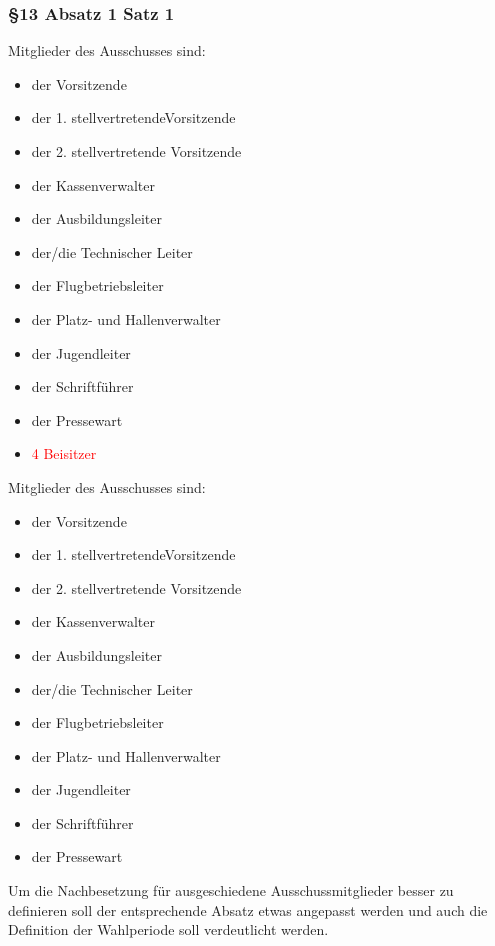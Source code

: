 \documentclass[10pt,a4paper,parskip=half]{scrartcl}
\newcommand{\old}[1]{\textcolor{Red}{#1}}
\newcommand{\change}[1]{
  \begin{adjustwidth}{20pt}{20pt}
    #1
  \end{adjustwidth}
}
\begin{document}
  \change{
  \subsubsection*{§13 Absatz 1 Satz 1}
  \begin{multicols}{2}
  Mitglieder des Ausschusses sind:
    \begin{itemize}[noitemsep]
      \item der Vorsitzende
      \item der 1. stellvertretendeVorsitzende
      \item der 2. stellvertretende Vorsitzende
      \item der Kassenverwalter
      \item der Ausbildungsleiter
      \item der/die Technischer Leiter
      \item der Flugbetriebsleiter
      \item der Platz- und Hallenverwalter
      \item der Jugendleiter
      \item der Schriftführer
      \item der Pressewart
      \item \old{4 Beisitzer}
    \end{itemize}
  \columnbreak
  Mitglieder des Ausschusses sind:
    \begin{itemize}[noitemsep]
      \item der Vorsitzende
      \item der 1. stellvertretendeVorsitzende
      \item der 2. stellvertretende Vorsitzende
      \item der Kassenverwalter
      \item der Ausbildungsleiter
      \item der/die Technischer Leiter
      \item der Flugbetriebsleiter
      \item der Platz- und Hallenverwalter
      \item der Jugendleiter
      \item der Schriftführer
      \item der Pressewart
    \end{itemize}
  \end{multicols}
  }

  Um die Nachbesetzung für ausgeschiedene Ausschussmitglieder besser zu definieren soll der entsprechende Absatz etwas angepasst werden und auch die Definition der Wahlperiode soll verdeutlicht werden.
\end{document}
